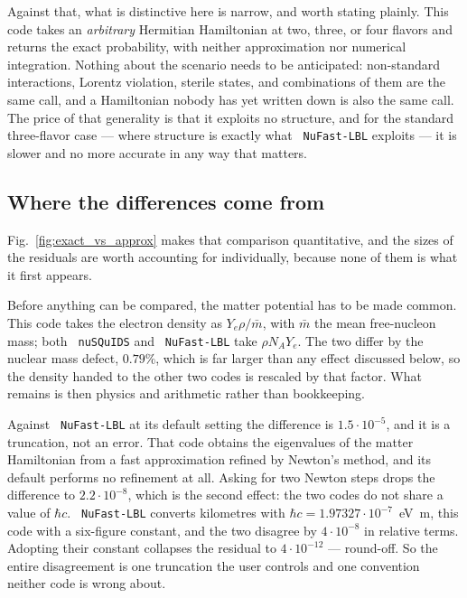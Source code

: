 \documentclass[final,5p,times,twocolumn]{elsarticle}
\newcommand{\fig}{Fig.}
\newcommand{\figu}[1]{\fig~\ref{fig:#1}}
\providecommand{\DIFaddtex}[1]{{\protect\color{blue} \sf #1}} %
\providecommand{\DIFadd}[1]{\DIFaddtex{#1}} %
\begin{document}
\DIFadd{Against that, what is distinctive here is narrow, and worth stating plainly.  This code takes an }\emph{\DIFadd{arbitrary}} \DIFadd{Hermitian Hamiltonian at two, three, or four flavors and returns the exact probability, with neither approximation nor numerical integration.  Nothing about the scenario needs to be anticipated: non-standard interactions, Lorentz violation, sterile states, and combinations of them are the same call, and a Hamiltonian nobody has yet written down is also the same call.  The price of that generality is that it exploits no structure, and for the standard three-flavor case --- where structure is exactly what }{\tt \DIFadd{NuFast-LBL}} \DIFadd{exploits --- it is slower and no more accurate in any way that matters.
}

\subsection{\DIFadd{Where the differences come from}}
\label{section:differences}

\DIFadd{\figu{exact_vs_approx} makes that comparison quantitative, and the sizes of the residuals are worth accounting for individually, because none of them is what it first appears.
}

\DIFadd{Before anything can be compared, the matter potential has to be made common.  This code takes the electron density as $Y_e \rho / \bar{m}$, with $\bar{m}$ the mean free-nucleon mass; both }{\tt \DIFadd{nuSQuIDS}} \DIFadd{and }{\tt \DIFadd{NuFast-LBL}} \DIFadd{take $\rho N_A Y_e$.  The two differ by the nuclear mass defect, $0.79\%$, which is far larger than any effect discussed below, so the density handed to the other two codes is rescaled by that factor.  What remains is then physics and arithmetic rather than bookkeeping.
}

\DIFadd{Against }{\tt \DIFadd{NuFast-LBL}} \DIFadd{at its default setting the difference is $1.5 \cdot 10^{-5}$, and it is a truncation, not an error.  That code obtains the eigenvalues of the matter Hamiltonian from a fast approximation refined by Newton's method, and its default performs no refinement at all.  Asking for two Newton steps drops the difference to $2.2 \cdot 10^{-8}$, which is the second effect: the two codes do not share a value of $\hbar c$.  }{\tt \DIFadd{NuFast-LBL}} \DIFadd{converts kilometres with $\hbar c = 1.97327 \cdot 10^{-7}$~eV~m, this code with a six-figure constant, and the two disagree by $4 \cdot 10^{-8}$ in relative terms.  Adopting their constant collapses the residual to $4 \cdot 10^{-12}$ --- round-off.  So the entire disagreement is one truncation the user controls and one convention neither code is wrong about.
}
\end{document}
